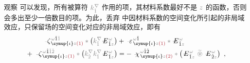 观察  可以发现，所有被算符 $\mathcolor{gray}{k^\nabla_{\check{1}}}$ 作用的项，其材料系数最好不是 $\mathcolor{gray}{z}$ 的函数，否则会多出至少一倍数目的项。为此，丢弃  中因材料系数的空间变化所引起的非局域效应，只保留场的空间变化对应的非局域效应，即有
\begin{subequations}
\begin{align}
	\Xint{\begin{smallmatrix} ~ \\ {}^{}_{\mathcolor{gray}{-}} \\ ~ \end{smallmatrix}}{12}{\zeta}^{\;\! \mathcolor{gray}{\omega} \hat{1} \mathcolor{gray}{\check{1}}}_{\;\! \symup{\iota} \mathcolor{gray}{z} \textcolor{Maroon}{(1)}} \mathcolor{gray}{*} \left( \mathcolor{gray}{k^\nabla_{\check{1}}} \Xint{\mathcolor{gray}{-}}{295}{E}^{\;\!\mathcolor{gray}{\omega}}_{\;\! \hat{1} \mathcolor{gray}{z}} \right) &+ \Xint{\begin{smallmatrix} ~ \\ {}^{}_{\mathcolor{gray}{-}} \\ ~ \end{smallmatrix}}{16}{\varepsilon}^{\;\! \mathcolor{gray}{\omega} \hat{1}}_{\;\! \symup{\iota} \mathcolor{gray}{z} \textcolor{Maroon}{(1)}} \mathcolor{gray}{*} \Xint{\mathcolor{gray}{-}}{295}{E}^{\;\!\mathcolor{gray}{\omega}}_{\;\! \hat{1} \mathcolor{gray}{z}}  \label{eq:nonlinear(2)-wave_wkrho-simplify3} \\ 
	+~ \Xint{\begin{smallmatrix} ~ \\ {}^{}_{\mathcolor{gray}{-}} \\ ~ \end{smallmatrix}}{12}{\zeta}^{\;\! \mathcolor{gray}{\omega} \hat{1} \mathcolor{gray}{\check{1} \check{2}}}_{\;\! \symup{\iota} \mathcolor{gray}{z} \textcolor{Maroon}{(1)}} \mathcolor{gray}{*} \left( \mathcolor{gray}{k^\nabla_{\check{2}}} \mathcolor{gray}{k^\nabla_{\check{1}}} \Xint{\mathcolor{gray}{-}}{295}{E}^{\;\!\mathcolor{gray}{\omega}}_{\;\! \hat{1} \mathcolor{gray}{z}} \right) &= - ~\Xint{{}^{}_{\mathcolor{gray}{-}}}{23}{\chi}^{\;\! \mathcolor{gray}{\omega} \hat{1} \hat{2}}_{\;\! \symup{\iota} \mathcolor{gray}{z} \textcolor{Maroon}{(2)}} \mathcolor{gray}{*} \left( \Xint{\mathcolor{gray}{-}}{295}{E}^{\;\!\mathcolor{gray}{\omega}}_{\;\! \hat{1} \mathcolor{gray}{z}} ~\mathcolor{gray}{\widetilde \circledast}~ \Xint{\mathcolor{gray}{-}}{295}{E}^{\;\!\mathcolor{gray}{\omega}}_{\;\! \hat{2} \mathcolor{gray}{z}} \right)~, \label{eq:nonlinear(2)-wave_wkrho-simplify3-2}
\end{align}
\end{subequations}
